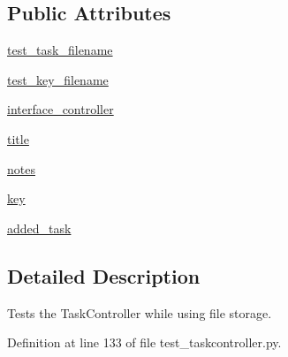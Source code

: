 \subsection*{\-Public \-Attributes}
\begin{DoxyCompactItemize}
\item 
\hyperlink{classtest__taskcontroller_1_1TestTaskControllerFileStorage_a049c3716a1d2a3c1e33c38eb654f15c9}{test\-\_\-task\-\_\-filename}
\item 
\hyperlink{classtest__taskcontroller_1_1TestTaskControllerFileStorage_adfb97b6e2fc6a47cc0da458781f256d6}{test\-\_\-key\-\_\-filename}
\item 
\hyperlink{classtest__taskcontroller_1_1TestTaskControllerFileStorage_acc2ab298aa1f3e5416310c8dfd118246}{interface\-\_\-controller}
\item 
\hyperlink{classtest__taskcontroller_1_1TestTaskControllerFileStorage_a4e8286cf16ac1c8751a710a36785aa69}{title}
\item 
\hyperlink{classtest__taskcontroller_1_1TestTaskControllerFileStorage_a6e7bbd4224d1fcff065cde59dbb651fc}{notes}
\item 
\hyperlink{classtest__taskcontroller_1_1TestTaskControllerFileStorage_ab690671055aca102212c66157ff1e246}{key}
\item 
\hyperlink{classtest__taskcontroller_1_1TestTaskControllerFileStorage_a5b9b16c50e8e488cbc066f5db85bca64}{added\-\_\-task}
\end{DoxyCompactItemize}


\subsection{\-Detailed \-Description}
\-Tests the \-Task\-Controller while using file storage. 

\-Definition at line 133 of file test\-\_\-taskcontroller.\-py.



